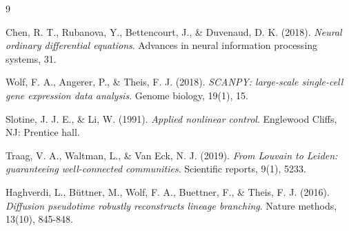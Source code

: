 \documentclass[12pt, a4paper]{article}
\begin{document}
	\begin{thebibliography}{9}
		
		Chen, R. T., Rubanova, Y., Bettencourt, J., \& Duvenaud, D. K. (2018). 
		\textit{Neural ordinary differential equations}. 
		Advances in neural information processing systems, 31.
		
		Wolf, F. A., Angerer, P., \& Theis, F. J. (2018). 
		\textit{SCANPY: large-scale single-cell gene expression data analysis}. 
		Genome biology, 19(1), 15.
		
		Slotine, J. J. E., \& Li, W. (1991). 
		\textit{Applied nonlinear control}. 
		Englewood Cliffs, NJ: Prentice hall.
		
		Traag, V. A., Waltman, L., \& Van Eck, N. J. (2019). 
		\textit{From Louvain to Leiden: guaranteeing well-connected communities}. 
		Scientific reports, 9(1), 5233.
		
		Haghverdi, L., Büttner, M., Wolf, F. A., Buettner, F., \& Theis, F. J. (2016). 
		\textit{Diffusion pseudotime robustly reconstructs lineage branching}. 
		Nature methods, 13(10), 845-848.
		
	\end{thebibliography}
\end{document}
